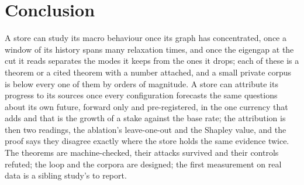 \documentclass[11pt,a4paper]{article}
\theoremstyle{plain}
\theoremstyle{definition}
\theoremstyle{remark}
\begin{document}
\section{Conclusion}

A store can study its macro behaviour once its graph has concentrated, once a window of its history
spans many relaxation times, and once the eigengap at the cut it reads separates the modes it keeps
from the ones it drops; each of these is a theorem or a cited theorem with a number attached, and a
small private corpus is below every one of them by orders of magnitude. A store can attribute its
progress to its sources once every configuration forecasts the same questions about its own future,
forward only and pre-registered, in the one currency that adds and that is the growth of a stake
against the base rate; the attribution is then two readings, the ablation's leave-one-out and the
Shapley value, and the proof says they disagree exactly where the store holds the same evidence
twice. The theorems are machine-checked, their attacks survived and their controls refuted; the loop
and the corpora are designed; the first measurement on real data is a sibling study's to report.



\end{document}

